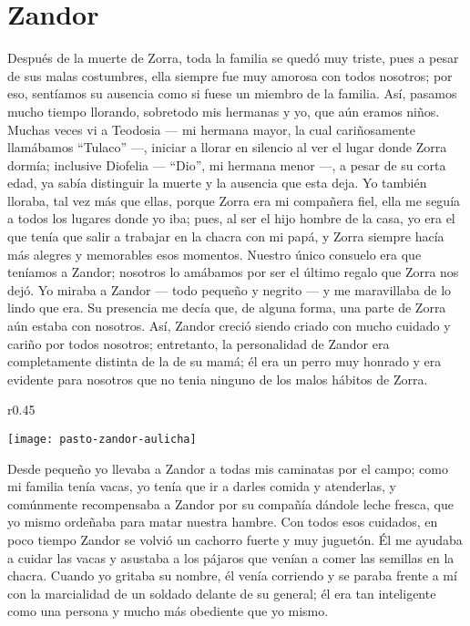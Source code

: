 \cleardoublepage
\newpage
\ifdefined\EnableIncludeImages
\fi
\chapter{Zandor}
Después de la muerte de Zorra, toda la familia se quedó muy triste, pues a pesar de sus malas costumbres, ella siempre fue muy amorosa con todos nosotros; por eso, sentíamos su ausencia como si fuese un miembro de la familia.
Así, pasamos mucho tiempo llorando, sobretodo mis hermanas y yo, que aún eramos niños.
Muchas veces vi a Teodosia --- mi hermana mayor, la cual cariñosamente llamábamos ``Tulaco'' ---, iniciar a llorar en silencio al ver el lugar donde Zorra dormía; inclusive Diofelia --- ``Dio'', mi hermana menor ---, a pesar de su corta edad, ya sabía distinguir la muerte y la ausencia que esta deja.
Yo también lloraba, tal vez más que ellas, porque Zorra era mi compañera fiel, ella me seguía a todos los lugares donde yo iba; pues, al ser el hijo hombre de la casa, yo era el que tenía que salir a trabajar en la chacra con mi papá, y Zorra siempre hacía más alegres y memorables esos momentos.
Nuestro único consuelo era que teníamos a Zandor; nosotros lo amábamos por ser el último regalo que Zorra nos dejó.
Yo miraba a Zandor --- todo pequeño y negrito --- y me maravillaba de lo lindo que era. Su presencia me decía que, de alguna forma, una parte de Zorra aún estaba con nosotros.
Así, Zandor creció siendo criado con mucho cuidado y cariño por todos nosotros;
entretanto, la personalidad de Zandor era completamente distinta de la de su mamá; él era un perro muy honrado y era evidente para nosotros que no tenia ninguno de los malos hábitos de Zorra.
\ifdefined\EnableIncludeImages
\begin{wrapfigure}{r}{0.45\textwidth}
  \begin{center}
  \vspace{-20pt}
    \texttt{[image: pasto-zandor-aulicha]}
  \end{center}
  \vspace{-20pt}
\end{wrapfigure}
\fi
Desde pequeño yo llevaba a Zandor a todas mis caminatas por el campo; como mi familia tenía vacas, yo tenía que ir a darles comida y atenderlas, y comúnmente recompensaba a Zandor por su compañía dándole leche fresca, que yo mismo ordeñaba para matar nuestra hambre.
Con todos esos cuidados, en poco tiempo Zandor se volvió un cachorro fuerte y muy juguetón.
Él me ayudaba a cuidar las vacas y asustaba a los pájaros que venían a comer las semillas en la chacra. Cuando yo gritaba su nombre, él venía corriendo y se paraba frente a mí con la marcialidad de un soldado delante de su general; él era tan inteligente como una persona y mucho más obediente que yo mismo.

